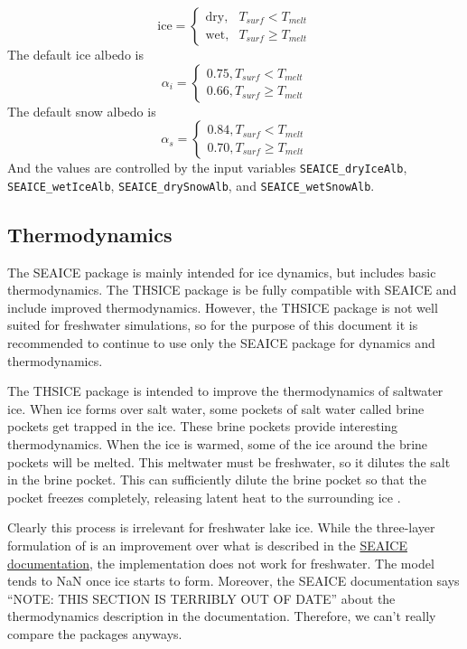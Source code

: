 \documentclass[11pt]{article}
\begin{document}
\begin{equation*}
\textrm{ice} = \begin{cases} \textrm{dry}, & T_{surf} < T_{melt} \\ \textrm{wet}, & T_{surf} \geq T_{melt} \end{cases}
\end{equation*}
The default ice albedo is
\begin{equation*}
\alpha_i = \begin{cases} 0.75, T_{surf} < T_{melt} \\ 0.66, T_{surf} \geq T_{melt} \end{cases}
\end{equation*}
The default snow albedo is
\begin{equation*}
\alpha_s = \begin{cases} 0.84, T_{surf} < T_{melt} \\ 0.70, T_{surf} \geq T_{melt} \end{cases}
\end{equation*}
And the values are controlled by the input variables \verb|SEAICE_dryIceAlb|, \verb|SEAICE_wetIceAlb|, \verb|SEAICE_drySnowAlb|, and \verb|SEAICE_wetSnowAlb|.

\subsection{Thermodynamics}
The SEAICE package is mainly intended for ice dynamics, but includes basic thermodynamics. The THSICE package is be fully compatible with SEAICE and include improved thermodynamics. However, the THSICE package is not well suited for freshwater simulations, so for the purpose of this document it is recommended to continue to use only the SEAICE package for dynamics and thermodynamics.

The THSICE package is intended to improve the thermodynamics of saltwater ice. When ice forms over salt water, some pockets of salt water called brine pockets get trapped in the ice. These brine pockets provide interesting thermodynamics. When the ice is warmed, some of the ice around the brine pockets will be melted. This meltwater must be freshwater, so it dilutes the salt in the brine pocket. This can sufficiently dilute the brine pocket so that the pocket freezes completely, releasing latent heat to the surrounding ice \cite{Winton2000}.

Clearly this process is irrelevant for freshwater lake ice. While the three-layer formulation of \cite{Winton2000} is an improvement over what is described in the \href{http://mitgcm.org/public/r2_manual/final/online_documents/node254.html}{SEAICE documentation}, the implementation does not work for freshwater. The model tends to NaN once ice starts to form. Moreover, the SEAICE documentation says ``NOTE: THIS SECTION IS TERRIBLY OUT OF DATE'' about the thermodynamics description in the documentation. Therefore, we can't really compare the packages anyways.
\end{document}
